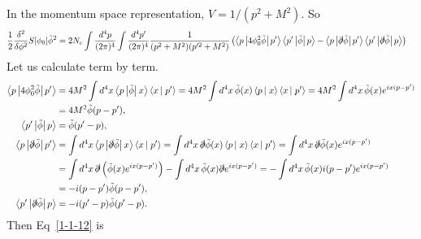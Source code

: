 \documentclass[tightenlines,floatfix,nofootinbib,superscriptaddress,fleqn]{revtex4-2}
\begin{document}
In the momentum space representation, $V = 1/(p^2+M^2)$. So
\begin{align}\label{1-1-12}
  \begin{split}
    \frac{1}{2}\frac{\delta^2}{\delta\phi^2}S[\phi_0]\tilde{\phi}^2
    &=2N_c\int\frac{d^4p}{(2\pi)^4}\int\frac{d^4p'}{(2\pi)^4}
    \frac{1}{(p^2+M^2)(p'^2+M^2)}
    \left(\left<p\left|4\phi_0^2\tilde{\phi}\right|p'\right>
    \left<p'\left|\tilde{\phi}\right|p\right>
    -\left<p\left|\slashed{\partial}\tilde{\phi}\right|p'\right>
    \left<p'\left|\slashed{\partial}\tilde{\phi}\right|p\right>
    \right)
  \end{split}
\end{align}
Let us calculate term by term.
\begin{align}\label{1-1-13}
  \begin{split}
    \left<p\left|4\phi_0^2\tilde{\phi}\right|p'\right>
    &=4M^2\int d^4x\left<p\left|\tilde{\phi}
    \right|x\right>\left<x\left| \right.p'\right>
    =4M^2\int d^4x\,\tilde{\phi}(x)\left<p\left|
    \right.x\right>\left<x\left| \right.p'\right>
    =4M^2\int d^4x\,\tilde{\phi}(x)e^{ix(p-p')} \\
    &= 4M^2\tilde{\phi}(p-p'), \\
    \left<p'\left|\tilde{\phi}\right|p\right>&=\tilde{\phi}(p'-p),  \\
    \left<p\left|\slashed{\partial}\tilde{\phi}\right|p'\right>&= 
    \int d^4x\left<p\left|\slashed{\partial}\tilde{\phi}
    \right|x\right>\left<x\left| \right.p'\right>
    =\int d^4x\,\slashed{\partial}\tilde{\phi}(x)\left<p\left|
    \right.x\right>\left<x\left| \right.p'\right>
    =\int d^4x\,\slashed{\partial}\tilde{\phi}(x)e^{ix(p-p')} \\
    &=\int d^4x\,\slashed{\partial}\left(\tilde{\phi}(x)e^{ix(p-p')}\right)
    -\int d^4x\,\tilde{\phi}(x)\slashed{\partial}e^{ix(p-p')}
    =-\int d^4x\,\tilde{\phi}(x)i(p-p')e^{ix(p-p')} \\
    &=-i(p-p')\tilde{\phi}(p-p'),
    \\
    \left<p'\left|\slashed{\partial}\tilde{\phi}\right|p\right>&=  
    -i(p'-p)\tilde{\phi}(p'-p).
  \end{split}
\end{align}
Then Eq~\eqref{1-1-12} is
\end{document}
